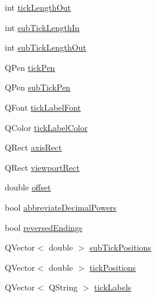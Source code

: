 \begin{DoxyCompactItemize}
\item 
int \hyperlink{class_q_c_p_axis_painter_private_acbebb1f868906200f968627bc907b77d}{tick\+Length\+Out}
\item 
int \hyperlink{class_q_c_p_axis_painter_private_af11f7d83021c9cb3b0e76fe7814c6110}{sub\+Tick\+Length\+In}
\item 
int \hyperlink{class_q_c_p_axis_painter_private_a5f1afddc3dc7ccc4d5adcbcd8f0c2218}{sub\+Tick\+Length\+Out}
\item 
Q\+Pen \hyperlink{class_q_c_p_axis_painter_private_a389dde97f02fdee23965e4736e7d8c62}{tick\+Pen}
\item 
Q\+Pen \hyperlink{class_q_c_p_axis_painter_private_a9b9cf594cd16575f52ecda9abef4e412}{sub\+Tick\+Pen}
\item 
Q\+Font \hyperlink{class_q_c_p_axis_painter_private_a06cb4b185feb1e560e01d65887e4d80d}{tick\+Label\+Font}
\item 
Q\+Color \hyperlink{class_q_c_p_axis_painter_private_a88032cf15c997e3956b79617b859e8ad}{tick\+Label\+Color}
\item 
Q\+Rect \hyperlink{class_q_c_p_axis_painter_private_afcd55b0e1ecd689fffd2b1fc75dc7732}{axis\+Rect}
\item 
Q\+Rect \hyperlink{class_q_c_p_axis_painter_private_a8627dc6b40781e3291bb508e4ac574d6}{viewport\+Rect}
\item 
double \hyperlink{class_q_c_p_axis_painter_private_aea226a1e39357d71f66d85093e30a830}{offset}
\item 
bool \hyperlink{class_q_c_p_axis_painter_private_a68353c2eeabd00d96a2e36a0b3809cb2}{abbreviate\+Decimal\+Powers}
\item 
bool \hyperlink{class_q_c_p_axis_painter_private_a06d0ef3f4f1b567feb84196fc3b140da}{reversed\+Endings}
\item 
Q\+Vector$<$ double $>$ \hyperlink{class_q_c_p_axis_painter_private_afcde7484bbcc1004b8f59ab984ada6f9}{sub\+Tick\+Positions}
\item 
Q\+Vector$<$ double $>$ \hyperlink{class_q_c_p_axis_painter_private_ae55e3dc2cf2af8d8a6e7235ccab54786}{tick\+Positions}
\item 
Q\+Vector$<$ Q\+String $>$ \hyperlink{class_q_c_p_axis_painter_private_ad0a4998ca358ba751e84fca45a025abd}{tick\+Labels}
\end{DoxyCompactItemize}
